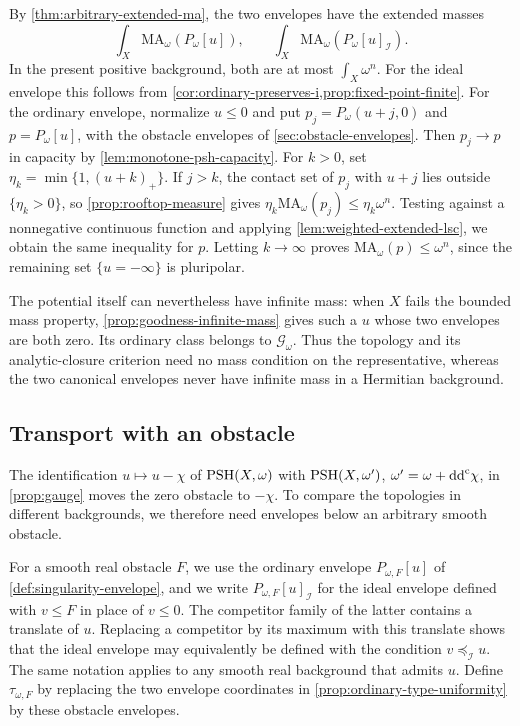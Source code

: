 By \cref{thm:arbitrary-extended-ma}, the two envelopes have the extended masses
\[
 \int_X\mathrm{MA}_\omega(P_\omega[u]),\qquad
 \int_X\mathrm{MA}_\omega(P_\omega[u]_{\mathcal I}).
\]
In the present positive background, both are at most $\int_X\omega^n$. For the ideal envelope this follows from \cref{cor:ordinary-preserves-i,prop:fixed-point-finite}. For the ordinary envelope, normalize $u\leq0$ and put $p_j=P_\omega(u+j,0)$ and $p=P_\omega[u]$, with the obstacle envelopes of \cref{sec:obstacle-envelopes}. Then $p_j\to p$ in capacity by \cref{lem:monotone-psh-capacity}. For $k>0$, set $\eta_k=\min\{1,(u+k)_+\}$. If $j>k$, the contact set of $p_j$ with $u+j$ lies outside $\{\eta_k>0\}$, so \cref{prop:rooftop-measure} gives $\eta_k\mathrm{MA}_\omega(p_j)\leq\eta_k\omega^n$. Testing against a nonnegative continuous function and applying \cref{lem:weighted-extended-lsc}, we obtain the same inequality for $p$. Letting $k\to\infty$ proves $\mathrm{MA}_\omega(p)\leq\omega^n$, since the remaining set $\{u=-\infty\}$ is pluripolar.

The potential itself can nevertheless have infinite mass: when $X$ fails the bounded mass property, \cref{prop:goodness-infinite-mass} gives such a $u$ whose two envelopes are both zero. Its ordinary class belongs to $\mathcal G_\omega$. Thus the topology and its analytic-closure criterion need no mass condition on the representative, whereas the two canonical envelopes never have infinite mass in a Hermitian background.

\subsection{Transport with an obstacle}
\label{subsec:obstacle-transport}

The identification $u\mapsto u-\chi$ of $\mathrm{PSH}(X,\omega)$ with $\mathrm{PSH}(X,\omega')$, $\omega'=\omega+\mathrm{dd}^{\mathrm{c}}\chi$, in \cref{prop:gauge} moves the zero obstacle to $-\chi$. To compare the topologies in different backgrounds, we therefore need envelopes below an arbitrary smooth obstacle.

For a smooth real obstacle $F$, we use the ordinary envelope $P_{\omega,F}[u]$ of \cref{def:singularity-envelope}, and we write $P_{\omega,F}[u]_{\mathcal I}$ for the ideal envelope defined with $v\leq F$ in place of $v\leq0$. The competitor family of the latter contains a translate of $u$. Replacing a competitor by its maximum with this translate shows that the ideal envelope may equivalently be defined with the condition $v\preceq_{\mathcal I}u$. The same notation applies to any smooth real background that admits $u$. Define $\tau_{\omega,F}$ by replacing the two envelope coordinates in \cref{prop:ordinary-type-uniformity} by these obstacle envelopes.

